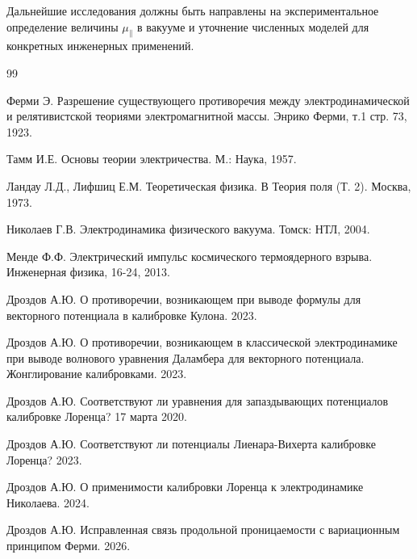 \documentclass[12pt, a4paper]{article}
\begin{document}
Дальнейшие исследования должны быть направлены на экспериментальное определение величины $\mu_{\parallel}$ в вакууме и уточнение численных моделей для конкретных инженерных применений.

\begin{thebibliography}{99}

Ферми Э. Разрешение существующего противоречия между электродинамической и релятивистской теориями электромагнитной массы. Энрико Ферми, т.1 стр. 73, 1923.

Тамм И.Е. Основы теории электричества. М.: Наука, 1957.

Ландау Л.Д., Лифшиц Е.М. Теоретическая физика. В Теория поля (Т. 2). Москва, 1973.

Николаев Г.В. Электродинамика физического вакуума. Томск: НТЛ, 2004.

Менде Ф.Ф. Электрический импульс космического термоядерного взрыва. Инженерная физика, 16-24, 2013.

Дроздов А.Ю. О противоречии, возникающем при выводе формулы для векторного потенциала в калибровке Кулона. 2023.

Дроздов А.Ю. О противоречии, возникающем в классической электродинамике при выводе волнового уравнения Даламбера для векторного потенциала. Жонглирование калибровками. 2023.

Дроздов А.Ю. Соответствуют ли уравнения для запаздывающих потенциалов калибровке Лоренца? 17 марта 2020.

Дроздов А.Ю. Соответствуют ли потенциалы Лиенара-Вихерта калибровке Лоренца? 2023.

Дроздов А.Ю. О применимости калибровки Лоренца к электродинамике Николаева. 2024.

Дроздов А.Ю. Исправленная связь продольной проницаемости с вариационным принципом Ферми. 2026.

\end{thebibliography}
\end{document}
